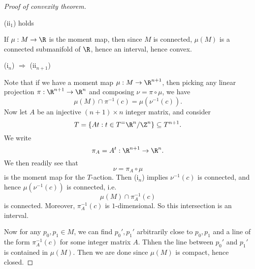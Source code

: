 \documentclass[a4paper]{article}
\begin{document}
\begin{proof}[Proof of convexity theorem]
  \begin{claim}
    (ii$_1$) holds
  \end{claim}
  If $\mu: M \to \R$ is the moment map, then since $M$ is connected, $\mu(M)$ is a connected submanifold of $\R$, hence an interval, hence convex.

  \begin{claim}
    (i$_n$) $\Rightarrow$ (ii$_{n + 1}$)
  \end{claim}
  Note that if we have a moment map $\mu: M \to \R^{n + 1}$, then picking any linear projection $\pi: \R^{n + 1} \to \R^n$ and composing $\nu = \pi \circ \mu$, we have
  \[
    \mu(M) \cap \pi^{-1}(c) = \mu(\nu^{-1}(c)).
  \]
  Now let $A$ be an injective $(n + 1) \times n$ integer matrix, and consider
  \[
    T = \{At : t \in T^ = \R^n/\Z^n\} \subseteq T^{n + 1}.
  \]
  We write
  \[
    \pi_A = A^t:\R^{n + 1} \to \R^n.
  \]
  We then readily see that
  \[
    \nu = \pi_{A} \circ \mu
  \]
  is the moment map for the $T$-action. Then (i$_n$) implies $\nu^{-1}(c)$ is connected, and hence $\mu(\nu^{-1}(c))$ is connected, i.e.
  \[
    \mu(M) \cap \pi_A^{-1}(c)
  \]
  is connected. Moreover, $\pi_A^{-1}(c)$ is $1$-dimensional. So this intersection is an interval.

  Now for any $p_0, p_1 \in M$, we can find $p_0', p_1'$ arbitrarily close to $p_0, p_1$ and a line of the form $\pi_A^{-1}(c)$ for some integer matrix $A$. Thhen the line between $p_0'$ and $p_1'$ is contained in $\mu(M)$. Then we are done since $\mu(M)$ is compact, hence closed.
\end{proof}
\end{document}
